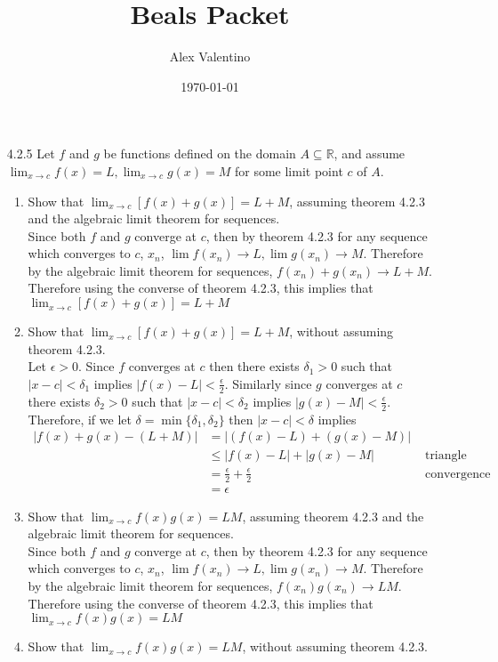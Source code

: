 \documentclass[12pt, letterpaper]{article}
\date{\today}
\author{Alex Valentino}
\title{Beals Packet}
\newcommand{\R}{\mathbb{R}}
\begin{document}
	\begin{enumerate}
	\item[4.2.5] Let $f$ and $g$ be functions defined on the domain $A \subseteq \R$, and assume $\lim_{x \to c} f(x) = L, \lim_{x \to c} g(x) = M$ for some limit point $c$ of $A$.
	\begin{enumerate}
		\item Show that $\lim_{x \to c} [f(x) + g(x)] = L + M$, assuming theorem 4.2.3 and the algebraic limit theorem for sequences.\\
		Since both $f$ and $g$ converge at $c$, then by theorem 4.2.3 for any sequence which converges to $c$, $x_n$, $\lim f(x_n) \to L, \lim g(x_n) \to M$.  Therefore by the algebraic limit theorem for sequences, $f(x_n) + g(x_n) \to L + M$.  Therefore using the converse of theorem 4.2.3, this implies that 
		$\lim_{x \to c} [f(x) + g(x)] = L + M$
		\item  Show that $\lim_{x \to c} [f(x) + g(x)] = L + M$, without assuming theorem 4.2.3.\\
		Let $\epsilon > 0$.  Since $f$ converges at $c$ then there exists $\delta_1 > 0$ such that $|x-c| < \delta_1$ implies $|f(x) - L| < \frac{\epsilon}{2}$.  Similarly since $g$ converges at $c$ there exists $\delta_2 > 0$ such that 
		$|x-c| < \delta_2$ implies $|g(x) - M| < \frac{\epsilon}{2}$.  Therefore, 
		if we let $\delta = \min \{\delta_1, \delta_2\}$ then $|x - c| < \delta$ implies
		\begin{align*}
			|f(x) + g(x) - (L + M)| &= |(f(x) - L) + (g(x) - M)|\\
			&\leq |f(x) - L| + |g(x) - M| & \text{ triangle inequality}\\
			&= \frac{\epsilon}{2} + \frac{\epsilon}{2}  & \text{ convergence definitions}\\
			&= \epsilon
		\end{align*}
		\item Show that $\lim_{x \to c} f(x)g(x) = LM$, assuming theorem 4.2.3 and the algebraic limit theorem for sequences.\\
		Since both $f$ and $g$ converge at $c$, then by theorem 4.2.3 for any sequence which converges to $c$, $x_n$, $\lim f(x_n) \to L, \lim g(x_n) \to M$.  Therefore by the algebraic limit theorem for sequences, $f(x_n)g(x_n) \to LM$.  Therefore using the converse of theorem 4.2.3, this implies that 
		$\lim_{x \to c} f(x)g(x) = LM$
		\item Show that $\lim_{x \to c} f(x)g(x) = LM$, without assuming theorem 4.2.3.\\

\end{enumerate}
\end{enumerate}
\end{document}
